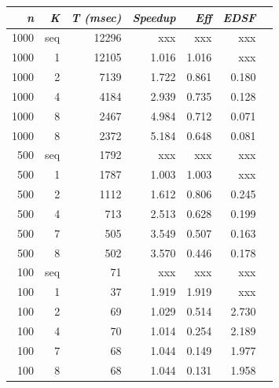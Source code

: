 \documentclass{dependencies/acm_proc_article-sp}
\begin{document}
\begin{center}
\begin{tabular}{|r|r|r|r|r|r|r|}\hline
{\em n} & {\em K} & {\em T (msec)} & {\em Speedup} & {\em Eff} & {\em EDSF} \\\hline
1000    & seq     &   12296           &   xxx         & xxx       & xxx        \\\hline
1000    & 1       &   12105           &   1.016       & 1.016     & xxx        \\\hline
1000    & 2       &   7139            &   1.722       & 0.861     & 0.180      \\\hline
1000    & 4       &   4184            &   2.939       & 0.735     & 0.128      \\\hline
1000    & 8       &   2467            &   4.984       & 0.712     & 0.071      \\\hline
1000    & 8       &   2372            &   5.184       & 0.648     & 0.081      \\\hline
500     & seq     &   1792            &   xxx         & xxx       & xxx        \\\hline
500     & 1       &   1787            &   1.003       & 1.003     & xxx        \\\hline
500     & 2       &   1112            &   1.612       & 0.806     & 0.245      \\\hline
500     & 4       &   713             &   2.513       & 0.628     & 0.199      \\\hline
500     & 7       &   505             &   3.549       & 0.507     & 0.163      \\\hline
500     & 8       &   502             &   3.570       & 0.446     & 0.178      \\\hline
100     & seq     &   71              &   xxx         & xxx       & xxx        \\\hline
100     & 1       &   37              &   1.919       & 1.919     & xxx        \\\hline
100     & 2       &   69              &   1.029       & 0.514     & 2.730      \\\hline
100     & 4       &   70              &   1.014       & 0.254     & 2.189      \\\hline
100     & 7       &   68              &   1.044       & 0.149     & 1.977      \\\hline
100     & 8       &   68              &   1.044       & 0.131     & 1.958      \\\hline
\end{tabular}
\end{center}
\end{document}
